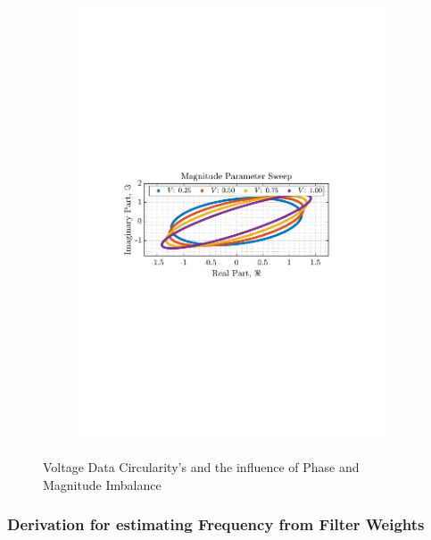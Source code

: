 \documentclass[12pt]{article}
\begin{document}
\begin{figure}[H]
\begin{subfigure}{0.49\textwidth}
					\includegraphics[trim={2.2cm 11.2cm 3.00cm  11.2cm}, clip, width=\textwidth]{../MATLAB/figures/q3_1c_fig04.pdf} 
					\captionsetup{justification=centering}
				\end{subfigure}
					
				\captionsetup{justification=centering}
				\caption{Voltage Data Circularity's and the influence of Phase and Magnitude Imbalance}
				\label{fig: 3-1c}
			\end{figure}
		\subsubsection{Derivation for estimating Frequency from Filter Weights}
\end{document}
